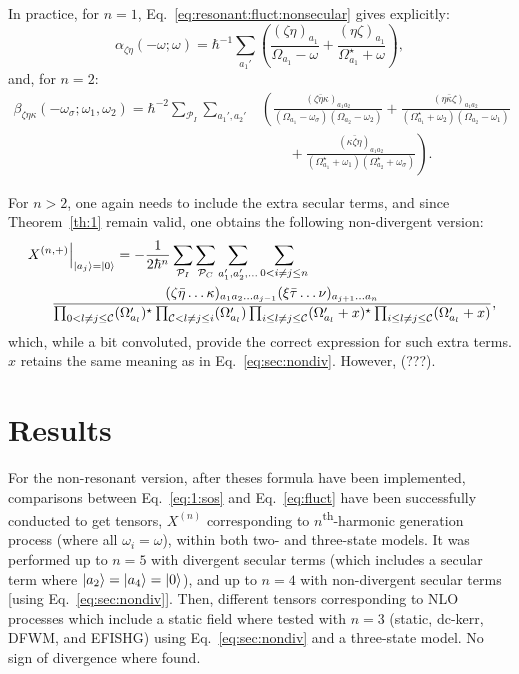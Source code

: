 \documentclass[12pt,a4paper]{article}
\begin{document}
In practice, for $n=1$, Eq.~\eqref{eq:resonant:fluct:nonsecular} gives explicitly:\begin{equation*}
	\alpha_{\zeta\eta}(-\omega; \omega) = \hbar^{-1} \sum_{a_1'} \left(\frac{(\zeta\eta)_{a_1}}{\Omega_{a_1} - \omega}+ \frac{(\eta\zeta)_{a_1}}{\Omega_{a_1}^\star + \omega}\right),
	\end{equation*}
	and, for $n=2$:
	\begin{align*}
	\beta_{\zeta\eta\kappa}(-\omega_\sigma; \omega_1, \omega_2) = \hbar^{-2} \sum_{\mathcal{P}_I} \sum_{a_1', a_2'} &\left(\frac{(\zeta\bar{\eta}\kappa)_{a_1 a_2}}{(\Omega_{a_1} - \omega_\sigma)(\Omega_{a_2} - \omega_2)}+ \frac{(\eta\bar\kappa\zeta)_{a_1 a_2}}{(\Omega_{a_1}^\star +\omega_2)(\Omega_{a_2} -\omega_1)}\right.\\
	&\hspace{2em}+\left.\frac{(\kappa\bar\zeta\eta)_{a_1 a_2}}{(\Omega_{a_1}^\star + \omega_1)(\Omega_{a_2}^\star + \omega_\sigma)} \right).
\end{align*}

For $n>2$, one again needs to include the extra secular terms, and since  Theorem~\ref{th:1}  remain valid, one obtains the following non-divergent version:\begin{align}
	&\left. X^{(n,+)} \right|_{\ket{a_j} = \ket{0}} = -\frac{1}{2\hbar^n} \sum_{\mathcal{P}_I} \sum_{\mathcal{P}_C}\sum_{a_1', a_2', \ldots} \sum_{0 < i \neq j \leq n} \nonumber\\
	&\hspace{2em}\frac{(\zeta \bar{\eta} \ldots \kappa)_{a_1 a_2 \ldots a_{j-1}} (\xi \bar{\tau} \ldots \nu)_{a_{j+1} \ldots a_n}}{\prod_{0 < l \neq j \leq \mathcal C} (\Omega'_{a_l})^\star \prod_{ \mathcal C < l \neq j \leq i} (\Omega'_{a_l}) \prod_{i \leq l \neq j \leq  \mathcal C} (\Omega'_{a_l} + x)^\star \prod_{i \leq l \neq j \leq  \mathcal C} (\Omega'_{a_l} + x)}, \label{eq:resonant:sec:nondiv}
\end{align}
which, while a bit convoluted, provide the correct expression for such extra terms. $x$ retains the same meaning as in Eq.~\eqref{eq:sec:nondiv}. However, (???).



\section{Results}

For the non-resonant version, after theses formula have been implemented, comparisons between Eq.~\eqref{eq:1:sos} and Eq.~\eqref{eq:fluct} have been successfully conducted to get tensors, $X^{(n)}$ corresponding to $n$\textsuperscript{th}-harmonic generation process (where all $\omega_i = \omega$), within both two- and three-state models.
It was performed up to  $n = 5$ with divergent secular terms (which includes a secular term where $\ket{a_2} = \ket{a_4} = \ket{0}$), and up to $n=4$ with non-divergent secular terms [using Eq.~\eqref{eq:sec:nondiv}]. Then, different tensors corresponding to NLO processes which include a static field where tested with $n=3$ (static, dc-kerr, DFWM, and EFISHG) using Eq.~\eqref{eq:sec:nondiv} and a three-state model. No sign of divergence where found.
\end{document}
